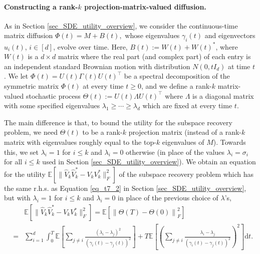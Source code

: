 \documentclass[11pt,letterpaper]{article}
\begin{document}
\paragraph{Constructing a rank-$k$ projection-matrix-valued diffusion. }  As in  Section \ref{sec_SDE_utility_overview}, we consider the continuous-time matrix diffusion $\Phi(t) = M + B(t),$ whose eigenvalues $\gamma_i(t)$ and eigenvectors $u_i(t)$, $i\in [d]$, evolve over time.
%
Here, $B(t) := W(t) + W(t)^\ast$, where $W(t)$ is a $d \times d$ matrix where the real part (and complex part) of each entry is an independent standard Brownian motion with distribution $N(0, tI_d)$ at time $t$.
%
We let $\Phi(t) = U(t) \Gamma(t) U(t)^\top$  be a spectral decomposition of the symmetric matrix $\Phi(t)$ at every time $t\geq 0$, and we define a rank-$k$ matrix-valued stochastic process $\Theta(t):= U(t) \Lambda U(t)^\top$ where $\Lambda$ is a diagonal matrix with some specified eigenvalues $\lambda_1 \geq \cdots \geq \lambda_d$ which are fixed at every time $t$.
 
The main difference is that, to bound the utility for the subspace recovery problem, we need $\Theta(t)$ to be a rank-$k$ projection matrix (instead of a rank-$k$ matrix with eigenvalues roughly equal to the top-$k$ eigenvalues of $M$).
%
Towards this, we set $\lambda_i = 1$ for  $i \leq k$ and $\lambda_i = 0$ otherwise (in place of the values $\lambda_i = \sigma_i$ for all $i \leq k$ used in Section \ref{sec_SDE_utility_overview}).
%
We obtain an equation for the utility $\mathbb{E}[\|\hat{V}_k\hat{V}_k^\ast -  V_k V_k^\ast  \|_F^2]$ of the subspace recovery problem which has the same r.h.s. as Equation \eqref{eq_t7_2} in Section \ref{sec_SDE_utility_overview}, but with $\lambda_i = 1$ for  $i \leq k$ and $\lambda_i = 0$ in place of the previous choice of $\lambda$'s,
%
    \begin{eqnarray}\label{eq_t7_2_b} %
& & \!\!\!\!\!\!\!\!\!\!\!\!\!\!\!\!\!\!\!\!\!\!\!\!\!\!\!\!\!\!\!\!\!\!\!\! \mathbb{E}[\|\hat{V}_k\hat{V}_k^\ast -  V_k V_k^\ast  \|_F^2] = \mathbb{E}\left[\left\|\Theta(T) -  \Theta(0)\right \|_F^2 \right]\nonumber\\
%
 &=&   \sum_{i=1}^{d} \int_0^{T} \mathbb{E}\left[ \sum_{j \neq i}  \frac{(\lambda_i - \lambda_j)^2}{(\gamma_i(t)-\gamma_j(t))^2} \right]
     +    T \mathbb{E}\left[\left(\sum_{j\neq i} \frac{\lambda_i - \lambda_j}{(\gamma_i(t)-\gamma_j(t))^2}\right)^2   \right]\mathrm{d}t.
\end{eqnarray}
\end{document}
